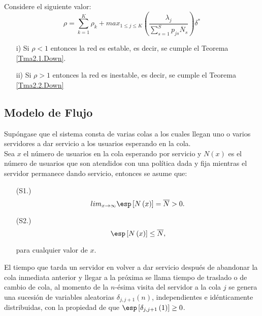 \begin{Teo}\label{Tma2.3.Down}
Considere el siguiente valor:
\begin{equation}\label{Eq.Rho.1serv}
\rho=\sum_{k=1}^{K}\rho_{k}+max_{1\leq j\leq K}\left(\frac{\lambda_{j}}{\sum_{s=1}^{S}p_{js}\overline{N}_{s}}\right)\delta^{*}
\end{equation}
\begin{itemize}
\item[i)] Si $\rho<1$ entonces la red es estable, es decir, se
cumple el Teorema \ref{Tma2.1.Down}.

\item[ii)] Si $\rho>1$ entonces la red es inestable, es decir, se
cumple el Teorema \ref{Tma2.2.Down}
\end{itemize}
\end{Teo}



\subsection{Modelo de Flujo}
Sup\'ongase que el sistema consta de varias colas a los cuales
llegan uno o varios servidores a dar servicio a los usuarios
esperando en la cola.\\


Sea $x$ el n\'umero de usuarios en la cola esperando por servicio
y $N\left(x\right)$ es el n\'umero de usuarios que son atendidos
con una pol\'itica dada y fija mientras el servidor permanece
dando servicio, entonces se asume que:
\begin{itemize}
\item[(S1.)]
\begin{equation}\label{S1}
lim_{x\rightarrow\infty}\esp\left[N\left(x\right)\right]=\overline{N}>0.
\end{equation}
\item[(S2.)]
\begin{equation}\label{S2}
\esp\left[N\left(x\right)\right]\leq \overline{N},
\end{equation}

para cualquier valor de $x$.
\end{itemize}

El tiempo que tarda un servidor en volver a dar servicio despu\'es
de abandonar la cola inmediata anterior y llegar a la pr\'oxima se
llama tiempo de traslado o de cambio  de cola, al momento de la
$n$-\'esima visita del servidor a la cola $j$ se genera una
sucesi\'on de variables aleatorias $\delta_{j,j+1}\left(n\right)$,
independientes e id\'enticamente distribuidas, con la propiedad de
que $\esp\left[\delta_{j,j+1}\left(1\right)\right]\geq0$.\\


